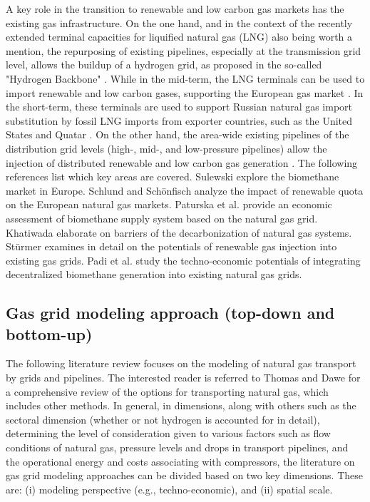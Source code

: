 A key role in the transition to renewable and low carbon gas markets has the existing gas infrastructure. On the one hand, and in the context of the recently extended terminal capacities for liquified natural gas (LNG) also being worth a mention, the repurposing of existing pipelines, especially at the transmission grid level, allows the buildup of a hydrogen grid, as proposed in the so-called "Hydrogen Backbone" \cite{hydrogen_backbone}. While in the mid-term, the LNG terminals can be used to import renewable and low carbon gases, supporting the European gas market \cite{al2022emerging}. In the short-term, these terminals are used to support Russian natural gas import substitution by fossil LNG imports from exporter countries, such as the United States and Quatar \cite{brauers2021liquefied}. On the other hand, the area-wide existing pipelines of the distribution grid levels (high-, mid-, and low-pressure pipelines) allow the injection of distributed renewable and low carbon gas generation \cite{cucchiella2018profitability}. The following references list which key areas are covered. Sulewski \cite{sulewski2023development} explore the biomethane market in Europe. Schlund and Schönfisch \cite{schlund2021analysing} analyze the impact of renewable quota on the European natural gas markets. Paturska et al. \cite{paturska2015economic} provide an economic assessment of biomethane supply system based on the natural gas grid. Khatiwada \cite{khatiwada2022decarbonization} elaborate on barriers of the decarbonization of natural gas systems. Stürmer \cite{sturmer2020greening} examines in detail on the potentials of renewable gas injection into existing gas grids. Padi et al. \cite{padi2023techno} study the techno-economic potentials of integrating decentralized biomethane generation into existing natural gas grids. 

\subsection{Gas grid modeling approach (top-down and bottom-up)}\label{approaches}
The following literature review focuses on the modeling of natural gas transport by grids and pipelines. The interested reader is referred to Thomas and Dawe \cite{thomas2003review} for a comprehensive review of the options for transporting natural gas, which includes other methods. In general, in dimensions, along with others such as the sectoral dimension (whether or not hydrogen is accounted for in detail), determining the level of consideration given to various factors such as flow conditions of natural gas, pressure levels and drops in transport pipelines, and the operational energy and costs associating with compressors, the literature on gas grid modeling approaches can be divided based on two key dimensions. These are: (i) modeling perspective (e.g., techno-economic), and (ii) spatial scale.\vspace{0.3cm}


